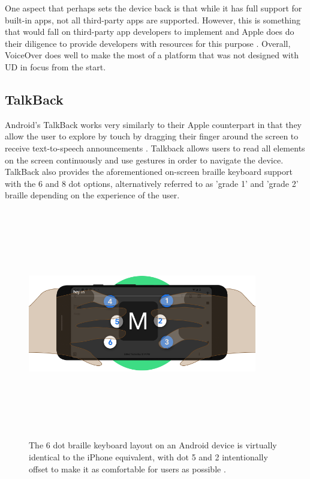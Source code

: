 One aspect that perhaps sets the device back is that while it has full support for built-in apps, not all third-party apps are supported.
However, this is something that would fall on third-party app developers to implement and Apple does do their diligence to provide developers with resources for this purpose \cite{iphonedev}.
Overall, VoiceOver does well to make the most of a platform that was not designed with UD in focus from the start.


\subsection{TalkBack}

Android's TalkBack works very similarly to their Apple counterpart in that they allow the user to explore by touch by dragging their finger around the screen to receive text-to-speech announcements \cite{android}.
Talkback allows users to read all elements on the screen continuously and use gestures in order to navigate the device. %
TalkBack also provides the aforementioned on-screen braille keyboard support with the 6 and 8 dot options, alternatively referred to as 'grade 1' and 'grade 2' braille depending on the experience of the user.

\begin{figure} [h]
    \centering
    \includegraphics[width=10cm,height=10cm,keepaspectratio]{Figures/braille_keyboard.png}
    \caption{The 6 dot braille keyboard layout on an Android device is virtually identical to the iPhone equivalent, with dot 5 and 2 intentionally offset to make it as comfortable for users as possible \cite{braille}.}
    \label{fig:Jellybean}
\end{figure}

